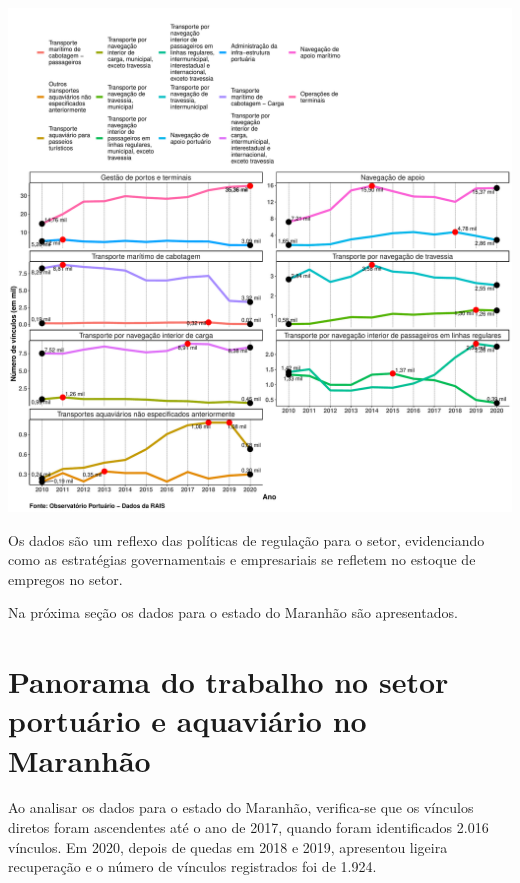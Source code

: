 \documentclass[
]{article}
\begin{document}
\includegraphics{mercado_trabalho_files/figure-latex/funcao2-1.pdf}

Os dados são um reflexo das políticas de regulação para o setor,
evidenciando como as estratégias governamentais e empresariais se
refletem no estoque de empregos no setor.

Na próxima seção os dados para o estado do Maranhão são apresentados.

\hypertarget{panorama-do-trabalho-no-setor-portuuxe1rio-e-aquaviuxe1rio-no-maranhuxe3o}{%
\section{Panorama do trabalho no setor portuário e aquaviário no
Maranhão}\label{panorama-do-trabalho-no-setor-portuuxe1rio-e-aquaviuxe1rio-no-maranhuxe3o}}

Ao analisar os dados para o estado do Maranhão, verifica-se que os
vínculos diretos foram ascendentes até o ano de 2017, quando foram
identificados 2.016 vínculos. Em 2020, depois de quedas em 2018 e 2019,
apresentou ligeira recuperação e o número de vínculos registrados foi de
1.924.
\end{document}
